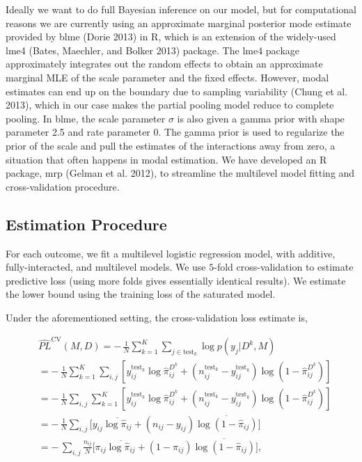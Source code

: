 \documentclass[11pt,article,oneside]{memoir}
\begin{document}
Ideally we want to do full Bayesian inference on our model, but for
computational reasons we are currently using an approximate marginal
posterior mode estimate provided by blme (Dorie 2013) in R, which is an
extension of the widely-used lme4 (Bates, Maechler, and Bolker 2013)
package. The lme4 package approximately integrates out the random
effects to obtain an approximate marginal MLE of the scale parameter and
the fixed effects. However, modal estimates can end up on the boundary
due to sampling variability (Chung et al. 2013), which in our case makes
the partial pooling model reduce to complete pooling. In blme, the scale
parameter \(\sigma\) is also given a gamma prior with shape parameter
2.5 and rate parameter 0. The gamma prior is used to regularize the
prior of the scale and pull the estimates of the interactions away from
zero, a situation that often happens in modal estimation. We have
developed an R package, mrp (Gelman et al. 2012), to streamline the
multilevel model fitting and cross-validation procedure.

\subsection{Estimation Procedure}\label{estimation-procedure}

For each outcome, we fit a multilevel logistic regression model, with
additive, fully-interacted, and multilevel models. We use \(5\)-fold
cross-validation to estimate predictive loss (using more folds gives
essentially identical results). We estimate the lower bound using the
training loss of the saturated model.

Under the aforementioned setting, the cross-validation loss estimate is,

\begin{align*}
  \label{eq:CV4MultiWaySurvey}
  &\widehat{PL}^{\text{CV}}(M, D) =-\,\frac{1}{N}\sum_{k=1}^K\sum_{j\in \text{test}_k}\log p(y_j|D^k, M)\\
  & = -\,\frac{1}{N}\sum_{k=1}^K\sum_{i,j} [y^{\text{test}_k}_{ij}\log\hat\pi_{ij}^{D^k}+(n^{\text{test}_k}_{ij}- y^{\text{test}_k}_{ij})\log(1-\hat\pi_{ij}^{D^k})]\\
  & = -\,\frac{1}{N}\sum_{i,j}\sum_{k=1}^K[ y^{\text{test}_k}_{ij}\log\hat\pi_{ij}^{D^k}+(n^{\text{test}_k}_{ij}- y^{\text{test}_k}_{ij})\log(1-\hat\pi_{ij}^{D^k})]\\
  & = -\,\frac{1}{N}\sum_{i,j}\big[y_{ij}\overline{\log\hat{\pi}_{ij}} +(n_{ij}- y_{ij})\overline{\log(1-\hat\pi_{ij})}\big]\\
  & = -\,\sum_{i,j}\frac{n_{ij}}{N}\big[\pi_{ij}\overline{\log\hat\pi_{ij}} +(1- \pi_{ij})\overline{\log(1-\hat\pi_{ij})}\big],
\end{align*}
\end{document}
